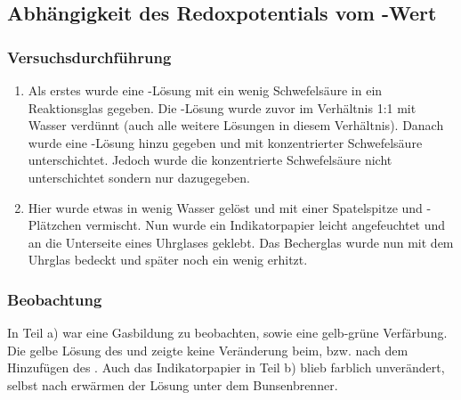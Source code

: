 \documentclass{scrartcl}
\begin{document}
\subsection{Abhängigkeit des Redoxpotentials vom \pH-Wert}
\subsubsection{Versuchsdurchführung}
\begin{enumerate}[label=\alph*)]
	\item Als erstes wurde eine -Lösung mit ein wenig Schwefelsäure in ein Reaktionsglas gegeben. Die -Lösung wurde zuvor im Verhältnis 1:1 mit Wasser verdünnt (auch alle weitere Lösungen in diesem Verhältnis). Danach wurde eine -Lösung hinzu gegeben und mit konzentrierter Schwefelsäure unterschichtet. Jedoch wurde die konzentrierte  Schwefelsäure nicht unterschichtet sondern nur dazugegeben.
	\item Hier wurde etwas  in wenig Wasser gelöst und mit einer Spatelspitze  und -Plätzchen vermischt. Nun wurde ein Indikatorpapier leicht angefeuchtet und an die Unterseite eines Uhrglases geklebt. Das Becherglas wurde nun mit dem Uhrglas bedeckt und später noch ein wenig erhitzt.
 \end{enumerate} 
 \subsubsection{Beobachtung}
In Teil a) war eine Gasbildung zu beobachten, sowie eine gelb-grüne Verfärbung.
Die gelbe Lösung des  und  zeigte keine Veränderung beim, bzw. nach dem Hinzufügen des . Auch das Indikatorpapier in Teil b) blieb farblich unverändert, selbst nach erwärmen der Lösung unter dem Bunsenbrenner.
\end{document}
